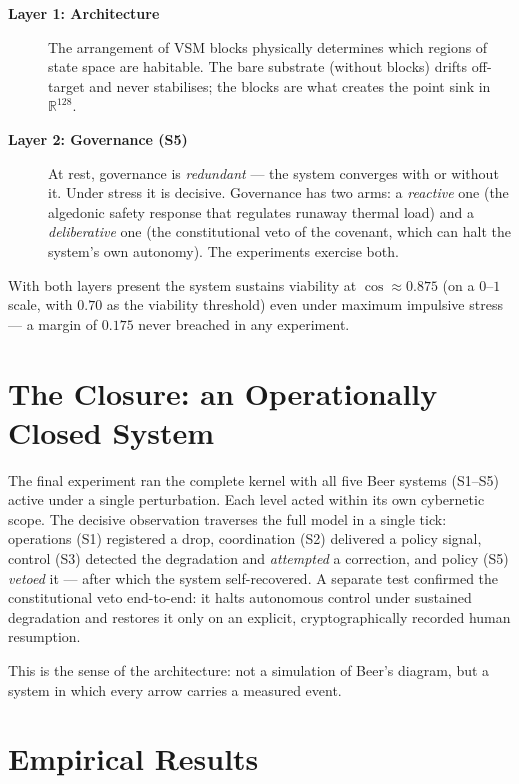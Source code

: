 \documentclass[11pt, a4paper]{article}
\newcommand{\R}{\mathbb{R}}
\begin{document}
\begin{description}
  \item[\textbf{Layer 1: Architecture}] The arrangement of VSM blocks physically
        determines which regions of state space are habitable. The bare substrate
        (without blocks) drifts off-target and never stabilises; the blocks are what
        creates the point sink in $\R^{128}$.
  \item[\textbf{Layer 2: Governance (S5)}] At rest, governance is \emph{redundant}
        --- the system converges with or without it. Under stress it is decisive.
        Governance has two arms: a \emph{reactive} one (the algedonic safety response
        that regulates runaway thermal load) and a \emph{deliberative} one (the
        constitutional veto of the covenant, which can halt the system's own
        autonomy). The experiments exercise both.
\end{description}

With both layers present the system sustains viability at $\cos \approx 0{.}875$
(on a $0$--$1$ scale, with $0{.}70$ as the viability threshold) even under maximum
impulsive stress --- a margin of $0{.}175$ never breached in any experiment.

\section*{The Closure: an Operationally Closed System}

The final experiment ran the complete kernel with all five Beer systems (S1--S5)
active under a single perturbation. Each level acted within its own cybernetic
scope. The decisive observation traverses the full model in a single tick: operations
(S1) registered a drop, coordination (S2) delivered a policy signal, control (S3)
detected the degradation and \emph{attempted} a correction, and policy (S5)
\emph{vetoed} it --- after which the system self-recovered. A separate test confirmed
the constitutional veto end-to-end: it halts autonomous control under sustained
degradation and restores it only on an explicit, cryptographically recorded human
resumption.

This is the sense of the architecture: not a simulation of Beer's diagram, but a
system in which every arrow carries a measured event.

\section*{Empirical Results}
\end{document}
